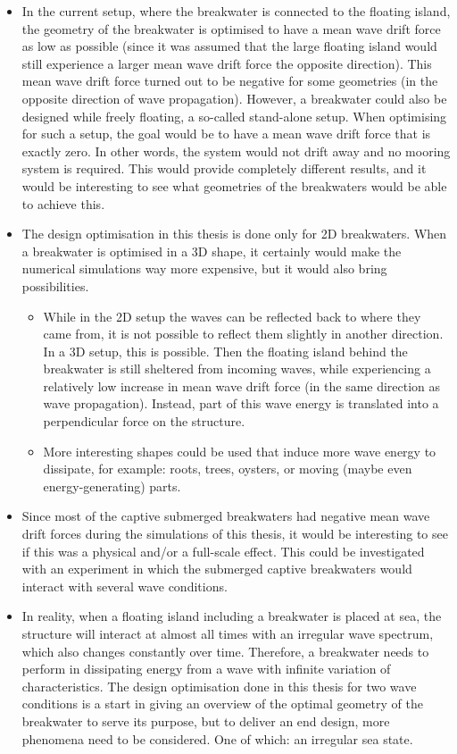 \begin{itemize}
    \item In the current setup, where the breakwater is connected to the floating island, the geometry of the breakwater is optimised to have a mean wave drift force as low as possible (since it was assumed that the large floating island would still experience a larger mean wave drift force the opposite direction). This mean wave drift force turned out to be negative for some geometries (in the opposite direction of wave propagation). However, a breakwater could also be designed while freely floating, a so-called stand-alone setup. When optimising for such a setup, the goal would be to have a mean wave drift force that is exactly zero. In other words, the system would not drift away and no mooring system is required. This would provide completely different results, and it would be interesting to see what geometries of the breakwaters would be able to achieve this. 
    
    \item The design optimisation in this thesis is done only for 2D breakwaters. When a breakwater is optimised in a 3D shape, it certainly would make the numerical simulations way more expensive, but it would also bring possibilities. 
    \begin{itemize}
        \item While in the 2D setup the waves can be reflected back to where they came from, it is not possible to reflect them slightly in another direction. In a 3D setup, this is possible. Then the floating island behind the breakwater is still sheltered from incoming waves, while experiencing a relatively low increase in mean wave drift force (in the same direction as wave propagation). Instead, part of this wave energy is translated into a perpendicular force on the structure. 
        \item More interesting shapes could be used that induce more wave energy to dissipate, for example: roots, trees, oysters, or moving (maybe even energy-generating) parts.
    \end{itemize}
    
    \item Since most of the captive submerged breakwaters had negative mean wave drift forces during the simulations of this thesis, it would be interesting to see if this was a physical and/or a full-scale effect. This could be investigated with an experiment in which the submerged captive breakwaters would interact with several wave conditions. 
    

    \item In reality, when a floating island including a breakwater is placed at sea, the structure will interact at almost all times with an irregular wave spectrum, which also changes constantly over time. Therefore, a breakwater needs to perform in dissipating energy from a wave with infinite variation of characteristics. The design optimisation done in this thesis for two wave conditions is a start in giving an overview of the optimal geometry of the breakwater to serve its purpose, but to deliver an end design, more phenomena need to be considered. One of which: an irregular sea state.
    

\end{itemize}
